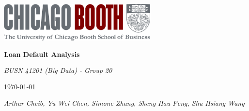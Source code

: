 \usepackage{graphicx}



\begin{titlepage}
  \centering
  \vspace*{2cm}

  \includegraphics[width=0.6\textwidth]{cover_image.png}

  \vspace{1cm}

  {\Huge\bfseries Loan Default Analysis}

  \vspace{2cm}

  {\Large\itshape BUSN 41201 (Big Data) - Group 20}

  \vfill

  {\large\today} %
  
  \vspace{2cm}
  
  {\Large\itshape Arthur Cheib, Yu-Wei Chen, Simone Zhang,
  Sheng-Hau Peng, Shu-Hsiang Wang}

  \vfill

\end{titlepage}


